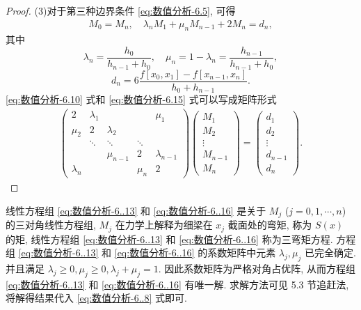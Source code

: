 \documentclass[../../main.tex]{subfiles}
\begin{document}
\begin{proof}
(3)对于第三种边界条件 \eqref{eq:数值分析-6.5}, 可得
\begin{align}
M_0 = M_n, \quad \lambda_n M_1 + \mu_n M_{n - 1} + 2 M_n = d_n, \label{eq:数值分析-6.15}
\end{align}
其中
\[
\lambda_n = \frac{h_0}{h_{n - 1} + h_0}, \quad \mu_n = 1 - \lambda_n = \frac{h_{n - 1}}{h_{n - 1} + h_0},
\]
\[
d_n = 6 \frac{f[x_0, x_1] - f[x_{n - 1}, x_n]}{h_0 + h_{n - 1}}.
\]
\eqref{eq:数值分析-6.10} 式和 \eqref{eq:数值分析-6.15} 式可以写成矩阵形式
\begin{align}
\begin{pmatrix}
2 & \lambda_1 & & & \mu_1 \\
\mu_2 & 2 & \lambda_2 & & \\
& \ddots & \ddots & \ddots & \\
& & \mu_{n - 1} & 2 & \lambda_{n - 1} \\
\lambda_n & & & \mu_n & 2
\end{pmatrix}
\begin{pmatrix}
M_1 \\
M_2 \\
\vdots \\
M_{n - 1} \\
M_n
\end{pmatrix}
=
\begin{pmatrix}
d_1 \\
d_2 \\
\vdots \\
d_{n - 1} \\
d_n
\end{pmatrix}. \label{eq:数值分析-6..16}
\end{align}

\end{proof}
\begin{remark}
线性方程组 \eqref{eq:数值分析-6..13} 和 \eqref{eq:数值分析-6..16} 是关于 $M_j$ ($j = 0, 1, \cdots, n$) 的三对角线性方程组, $M_j$ 在力学上解释为细梁在 $x_j$ 截面处的弯矩, 称为 $S(x)$ 的矩, 线性方程组 \eqref{eq:数值分析-6..13} 和 \eqref{eq:数值分析-6..16} 称为三弯矩方程. 方程组 \eqref{eq:数值分析-6..13} 和 \eqref{eq:数值分析-6..16} 的系数矩阵中元素 $\lambda_j, \mu_j$ 已完全确定. 并且满足 $\lambda_j \geqslant 0, \mu_j \geqslant 0, \lambda_j + \mu_j = 1$. 因此系数矩阵为严格对角占优阵, 从而方程组 \eqref{eq:数值分析-6..13} 和 \eqref{eq:数值分析-6..16} 有唯一解. 求解方法可见 5.3 节追赶法, 将解得结果代入 \eqref{eq:数值分析-6..8} 式即可.
\end{remark}
\end{document}
